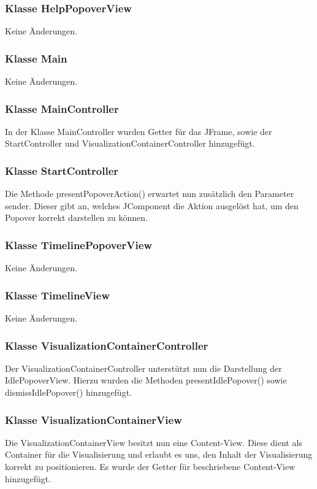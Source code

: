 \documentclass{article}
\begin{document}
    \subsubsection{Klasse HelpPopoverView}
      Keine Änderungen.

    \subsubsection{Klasse Main}
      Keine Änderungen.

    \subsubsection{Klasse MainController}
      In der Klasse MainController wurden Getter für das JFrame, sowie der StartController
      und VisualizationContainerController hinzugefügt.

    \subsubsection{Klasse StartController}
      Die Methode presentPopoverAction() erwartet nun zusätzlich den Parameter sender. Dieser gibt an, welches
      JComponent die Aktion ausgelöst hat, um den Popover korrekt darstellen zu können.

    \subsubsection{Klasse TimelinePopoverView}
      Keine Änderungen.

    \subsubsection{Klasse TimelineView}
      Keine Änderungen.

    \subsubsection{Klasse VisualizationContainerController}
      Der VisualizationContainerController unterstützt nun die Darstellung der IdlePopoverView. Hierzu wurden
      die Methoden presentIdlePopover() sowie dismissIdlePopover() hinzugefügt.\newline

    \subsubsection{Klasse VisualizationContainerView}
      Die VisualizationContainerView besitzt nun eine Content-View. Diese dient als Container für die Visualisierung
      und erlaubt es uns, den Inhalt der Visualisierung korrekt zu positionieren. Es wurde der Getter für
      beschriebene Content-View hinzugefügt.\newline
\end{document}
